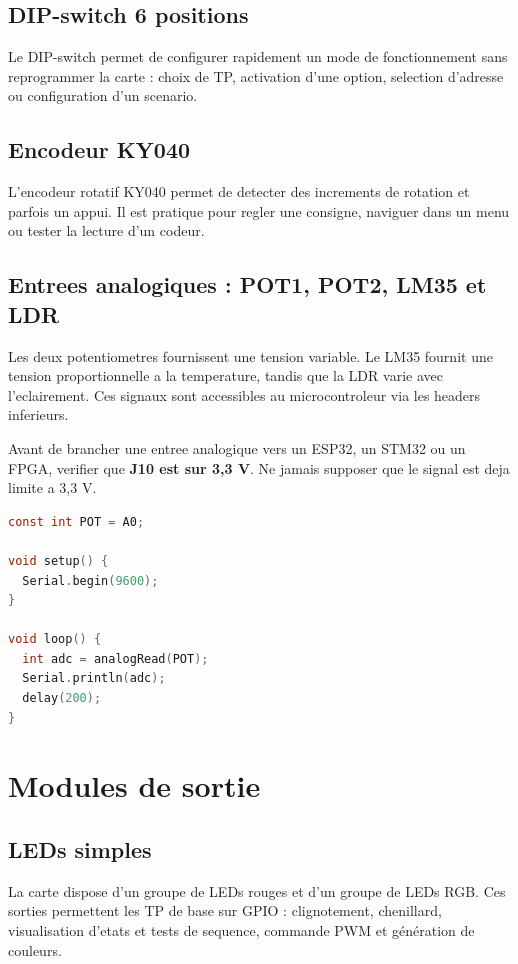 \documentclass[11pt,a4paper]{article}
\begin{document}
\subsection{DIP-switch 6 positions}
Le DIP-switch permet de configurer rapidement un mode de fonctionnement sans reprogrammer la carte : choix de TP, activation d'une option, selection d'adresse ou configuration d'un scenario.

\subsection{Encodeur KY040}
L'encodeur rotatif KY040 permet de detecter des increments de rotation et parfois un appui. Il est pratique pour regler une consigne, naviguer dans un menu ou tester la lecture d'un codeur.

\subsection{Entrees analogiques : POT1, POT2, LM35 et LDR}
Les deux potentiometres fournissent une tension variable. Le LM35 fournit une tension proportionnelle a la temperature, tandis que la LDR varie avec l'eclairement. Ces signaux sont accessibles au microcontroleur via les headers inferieurs.

\begin{warningbox}
Avant de brancher une entree analogique vers un ESP32, un STM32 ou un FPGA, verifier que \textbf{J10 est sur 3,3 V}. Ne jamais supposer que le signal est deja limite a 3,3 V.
\end{warningbox}

\begin{lstlisting}[language=C,caption={Lecture d'un potentiometre}]
const int POT = A0;

void setup() {
  Serial.begin(9600);
}

void loop() {
  int adc = analogRead(POT);
  Serial.println(adc);
  delay(200);
}
\end{lstlisting}

\section{Modules de sortie}
\subsection{LEDs simples}
La carte dispose d'un groupe de LEDs rouges et d'un groupe de LEDs RGB. Ces sorties permettent les TP de base sur GPIO : clignotement, chenillard, visualisation d'etats et tests de sequence, commande PWM et génération de couleurs.
\end{document}
